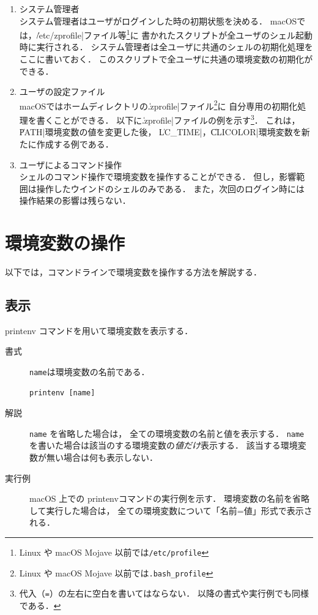 \begin{enumerate}
\item システム管理者 \\
  システム管理者はユーザがログインした時の初期状態を決める．
  macOSでは，\|/etc/zprofile|ファイル等\footnote{
    Linux や macOS Mojave 以前では\texttt{/etc/profile}}に
  書かれたスクリプトが全ユーザのシェル起動時に実行される．
  システム管理者は全ユーザに共通のシェルの初期化処理をここに書いておく．
  このスクリプトで全ユーザに共通の環境変数の初期化ができる．
\item ユーザの設定ファイル \\
  macOSではホームディレクトリの\|.zprofile|ファイル\footnote{
    Linux や macOS Mojave 以前では\texttt{.bash\_profile}}に
  自分専用の初期化処理を書くことができる．
  以下に\|.zprofile|ファイルの例を示す\footnote{
    代入（\texttt{=}）の左右に空白を書いてはならない．
    以降の書式や実行例でも同様である．}．
  これは，\|PATH|環境変数の値を変更した後，
  \|LC_TIME|，\|CLICOLOR|環境変数を新たに作成する例である．
  
\item ユーザによるコマンド操作 \\
  シェルのコマンド操作で環境変数を操作することができる．
  但し，影響範囲は操作したウインドのシェルのみである．
  また，次回のログイン時には操作結果の影響は残らない．
\end{enumerate}

\section{環境変数の操作}\label{environmentVariableOperation}
以下では，コマンドラインで環境変数を操作する方法を解説する．

\subsection{表示}
printenv コマンドを用いて環境変数を表示する．

\begin{description}
\item[書式] \texttt{name}は環境変数の名前である．
\begin{lstlisting}[numbers=none]
  printenv [name]
\end{lstlisting}
\item[解説]
  \texttt{name} を省略した場合は，
  全ての環境変数の名前と値を表示する．
  \texttt{name} を書いた場合は該当のする環境変数の\emph{値だけ}表示する．
  該当する環境変数が無い場合は何も表示しない．
\item [実行例]  macOS 上での printenvコマンドの実行例を示す．
  環境変数の名前を省略して実行した場合は，
  全ての環境変数について「名前=値」形式で表示される．
  
\end{description}

